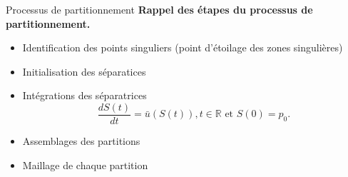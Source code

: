 \documentclass[compress,10pt,aspectratio=169]{beamer}
\begin{document}
\begin{frame}{Processus de partitionnement}%
\small
{\bf Rappel des étapes du processus de partitionnement.}\\\vspace{0.5cm}
\begin{itemize}
    \item Identification des points singuliers (point d'étoilage des zones singulières)\\\vspace{0.3cm}
    \item Initialisation des séparatices\\\vspace{0.3cm}
    \item Intégrations des séparatrices\vspace{0.3cm}
\begin{equation*}
\frac{dS(t)}{dt}=\bar{u}(S(t)),t\in \mathbb{R} \text{ et }  S(0)=p_0.
\end{equation*}
\item Assemblages des partitions\vspace{0.3cm}
\item Maillage de chaque partition\vspace{0.3cm}
\end{itemize}
\end{frame}
\end{document}
